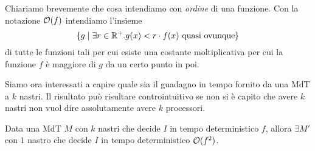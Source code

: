 Chiariamo brevemente che cosa intendiamo con \emph{ordine} di
una funzione. Con la notazione $\mathcal{O}(f)$ intendiamo l'insieme
\[
	\{ g \mid \exists r \in \mathbb{R}^+ . g(x) < r \cdot f(x)
	\text{ quasi ovunque} \}
\]
di tutte le funzioni tali per cui esiste una costante
moltiplicativa per cui la funzione $f$ è maggiore di $g$
da un certo punto in poi.

Siamo ora interessati a capire quale sia il guadagno in tempo
fornito da una MdT a $k$ nastri. Il risultato può risultare
controintuitivo se non si è capito che avere $k$ nastri non
vuol dire assolutamente avere $k$ processori.

\begin{theorem} \label{th: red_nastri}
	Data una MdT $M$ con $k$ nastri che decide $I$ in tempo
	deterministico $f$, allora $\exists M'$ con $1$ nastro che
	decide $I$ in tempo deterministico $\mathcal{O} (f^2)$.
\end{theorem}